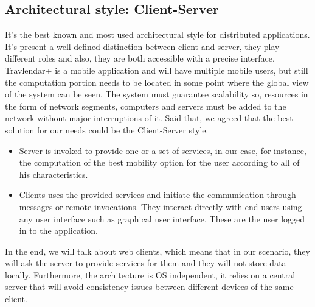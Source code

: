 \subsection{Architectural style: Client-Server}
It’s the best known and most used architectural style for distributed applications.
It’s present a well-defined distinction between client and server, they play different roles and also, they are both accessible with a precise interface.
Travlendar+ is a mobile application and will have multiple mobile users, but still the computation portion needs to be located in some point where the global view of the system can be seen.
The system must guarantee scalability so, resources in the form of network segments, computers and servers must be added to the network without major interruptions of it.
Said that, we agreed that the best solution for our needs could be the Client-Server style.
\begin{itemize}
\item	Server is invoked to provide one or a set of services, in our case, for instance, the computation of the best mobility option for the user according to all of his characteristics. 
\item	Clients uses the provided services and initiate the communication through messages or remote invocations. They interact directly with end-users using any user interface such as graphical user interface. These are the user logged in to the application.
\end{itemize}

In the end, we will talk about web clients, which means that in our scenario, they will ask the server to provide services for them and they will not store data locally. Furthermore, the architecture is OS independent, it relies on a central server that will avoid consistency issues between different devices of the same client.

